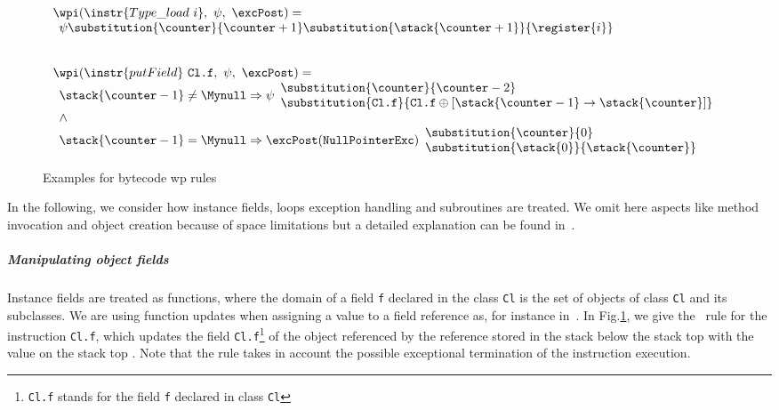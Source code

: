 \begin{figure}[htp]
\[
\begin{array}{l}
\wpi(\instr{Type\_load \ i}, \ \psi, \ \excPost)  = \\
\begin{array}{l}  \psi\substitution{\counter }{\counter+1} \substitution{\stack{\counter+1}}{\register{i}} \end{array} \\
\\
\\
 \wpi(\instr{putField} \ \texttt{Cl.f}, \ \psi, \ \excPost)  = \\
\begin{array}{l}
                \stack{\counter -1} \not= \Mynull\Rightarrow   
         \psi\begin{array}{l} \substitution{\counter}{ \counter-2 } \\[0 mm] 
                           \substitution{\texttt{Cl.f} }{ \texttt{Cl.f}\oplus [\stack{\counter -1} \rightarrow \stack{\counter}] } \\
                \end{array}\\

   \wedge \\
        \stack{\counter-1} = \Mynull    \Rightarrow \excPost(\tt{NullPointerExc})
        \begin{array}{l}
          \substitution{ \counter }{ 0} \\
          \substitution{\stack{0}}{ \stack{\counter}} 
        \end{array}
    \end{array} %
\end{array}
 \]       
\caption{\sc Examples for bytecode wp rules}
 \label{instrWP}

\end{figure}

In the following, we consider how instance fields, %
loops exception handling and subroutines are treated. We omit here aspects like method invocation and object creation because of space limitations but a detailed explanation can be found in~\cite{JBL05MP}. 

\subparagraph*{Manipulating object fields}
Instance fields are treated as functions, where the domain of a field \texttt{f} 
declared in the class \texttt{Cl} is the set of objects of class \texttt{Cl} and its subclasses.
We are using function updates when assigning a value to a field reference as, for instance in~\cite{B00ppp}.
In Fig.\ref{instrWP}, we give the \wpi \ rule for the
instruction  \texttt{Cl.f}, which updates the field \texttt{Cl.f}\footnote{ \texttt{Cl.f} stands for the field \texttt{f} declared in class 
\texttt{Cl}} of the object referenced by the reference stored in the stack below the stack top  with the value on the stack top \stack{\counter}.
Note that the rule takes in account the possible exceptional termination of the instruction execution.


